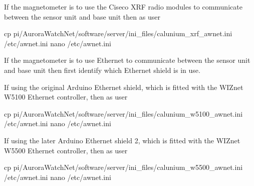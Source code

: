 If the magnetometer is to use the Ciseco XRF radio modules to
communicate between the sensor unit and base unit then as user
\rootUser
\begin{Cmd}[fontsize=\relsize{-1.75}]
cp \mytilde{}pi/AuroraWatchNet/software/server/ini_files/calunium_xrf_awnet.ini /etc/awnet.ini
nano /etc/awnet.ini
\end{Cmd}

If the magnetometer is to use Ethernet to communicate between the
sensor unit and base unit then first identify which Ethernet shield is in use.

If using the original Arduino Ethernet shield, which is fitted with
the WIZnet W5100 Ethernet controller, then as user \rootUser
\begin{Cmd}[fontsize=\relsize{-1.75}]
cp \mytilde{}pi/AuroraWatchNet/software/server/ini_files/calunium_w5100_awnet.ini /etc/awnet.ini
nano /etc/awnet.ini
\end{Cmd}

If using the later Arduino Ethernet shield 2, which is fitted with
the WIZnet W5500 Ethernet controller, then as user \rootUser
\begin{Cmd}[fontsize=\relsize{-1.75}]
cp \mytilde{}pi/AuroraWatchNet/software/server/ini_files/calunium_w5500_awnet.ini /etc/awnet.ini
nano /etc/awnet.ini
\end{Cmd}

